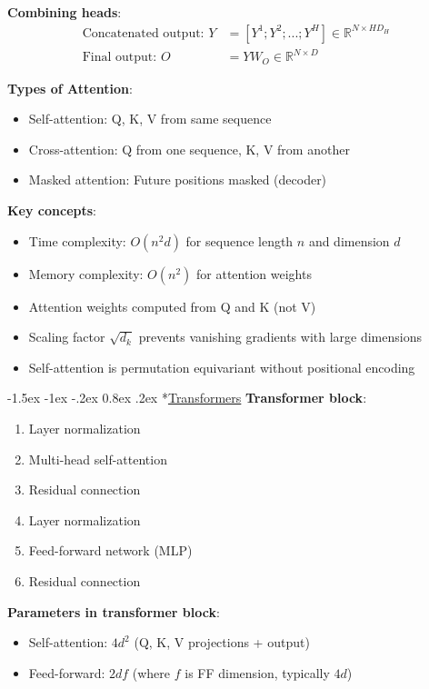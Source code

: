 \documentclass{article}
\makeatletter
\renewcommand\section{\@startsection{section}{1}{\z@}%
                                  {-1.5ex \@plus -1ex \@minus -.2ex}%
                                  {0.8ex \@plus.2ex}%
                                  {\normalfont\small\bfseries}}
\makeatother
\begin{document}
\begin{multicols}{3}
\textbf{Combining heads}:
\begin{align*}
\text{Concatenated output: } Y &= [Y^1; Y^2; ...; Y^H] \in \mathbb{R}^{N \times HD_H}\\
\text{Final output: } O &= YW_O \in \mathbb{R}^{N \times D}
\end{align*}

\textbf{Types of Attention}:
\begin{itemize}
\item Self-attention: Q, K, V from same sequence
\item Cross-attention: Q from one sequence, K, V from another
\item Masked attention: Future positions masked (decoder)
\end{itemize}

\textbf{Key concepts}:
\begin{itemize}
\item Time complexity: $O(n^2d)$ for sequence length $n$ and dimension $d$
\item Memory complexity: $O(n^2)$ for attention weights
\item Attention weights computed from Q and K (not V)
\item Scaling factor $\sqrt{d_k}$ prevents vanishing gradients with large dimensions
\item Self-attention is permutation equivariant without positional encoding
\end{itemize}

\section*{\underline{Transformers}}
\textbf{Transformer block}:
\begin{enumerate}
\item Layer normalization
\item Multi-head self-attention
\item Residual connection
\item Layer normalization
\item Feed-forward network (MLP)
\item Residual connection
\end{enumerate}

\textbf{Parameters in transformer block}:
\begin{itemize}
\item Self-attention: $4d^2$ (Q, K, V projections + output)
\item Feed-forward: $2df$ (where $f$ is FF dimension, typically $4d$)
\end{itemize}


\end{multicols}
\end{document}
